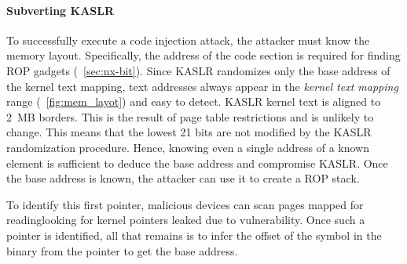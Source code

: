 

\paragraph{Subverting KASLR}
To successfully execute a code injection attack, the attacker must know the memory layout. Specifically, the address of the code section is required for finding ROP gadgets (\DIFdelbegin {}\DIFdelend \DIFaddbegin {}\DIFaddend ~\ref{sec:nx-bit}). 
Since KASLR randomizes only the base address of the kernel text mapping, text addresses always appear in the \textit{kernel text mapping} range (\DIFdelbegin {}\DIFdelend \DIFaddbegin {}\DIFaddend ~\ref{fig:mem_layot}) and \DIFdelbegin {}\DIFdelend \DIFaddbegin {}\DIFaddend easy to detect. KASLR kernel text is aligned to 2~MB borders. This is the result of page table restrictions and is unlikely to change. This means that the lowest 21 bits are not modified by the KASLR randomization procedure. Hence, knowing even a single address of a known element is sufficient to deduce the base address and compromise KASLR. Once the base address is known, the attacker can use it to create a ROP stack.

To identify this first pointer, malicious devices can scan \DIFaddbegin {}\DIFaddend pages mapped for reading\DIFaddbegin \DIFadd{, }\DIFaddend looking for kernel pointers \DIFdelbegin \DIFdel{, }\DIFdelend leaked due to \subpage{} vulnerability. Once such a pointer is identified, all that remains is to infer the offset of the symbol in the binary from the pointer to get the base address.%

